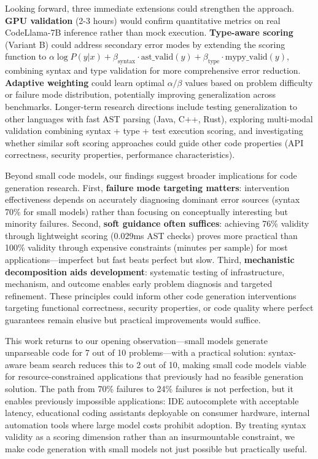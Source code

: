 Looking forward, three immediate extensions could strengthen the approach. \textbf{GPU validation} (2-3 hours) would confirm quantitative metrics on real CodeLlama-7B inference rather than mock execution. \textbf{Type-aware scoring} (Variant B) could address secondary error modes by extending the scoring function to $\alpha \log P(y|x) + \beta_{\text{syntax}} \cdot \text{ast\_valid}(y) + \beta_{\text{type}} \cdot \text{mypy\_valid}(y)$, combining syntax and type validation for more comprehensive error reduction. \textbf{Adaptive weighting} could learn optimal $\alpha/\beta$ values based on problem difficulty or failure mode distribution, potentially improving generalization across benchmarks. Longer-term research directions include testing generalization to other languages with fast AST parsing (Java, C++, Rust), exploring multi-modal validation combining syntax + type + test execution scoring, and investigating whether similar soft scoring approaches could guide other code properties (API correctness, security properties, performance characteristics).

Beyond small code models, our findings suggest broader implications for code generation research. First, \textbf{failure mode targeting matters}: intervention effectiveness depends on accurately diagnosing dominant error sources (syntax 70\% for small models) rather than focusing on conceptually interesting but minority failures. Second, \textbf{soft guidance often suffices}: achieving 76\% validity through lightweight scoring (0.029ms AST checks) proves more practical than 100\% validity through expensive constraints (minutes per sample) for most applications---imperfect but fast beats perfect but slow. Third, \textbf{mechanistic decomposition aids development}: systematic testing of infrastructure, mechanism, and outcome enables early problem diagnosis and targeted refinement. These principles could inform other code generation interventions targeting functional correctness, security properties, or code quality where perfect guarantees remain elusive but practical improvements would suffice.

This work returns to our opening observation---small models generate unparseable code for 7 out of 10 problems---with a practical solution: syntax-aware beam search reduces this to 2 out of 10, making small code models viable for resource-constrained applications that previously had no feasible generation solution. The path from 70\% failures to 24\% failures is not perfection, but it enables previously impossible applications: IDE autocomplete with acceptable latency, educational coding assistants deployable on consumer hardware, internal automation tools where large model costs prohibit adoption. By treating syntax validity as a scoring dimension rather than an insurmountable constraint, we make code generation with small models not just possible but practically useful.
